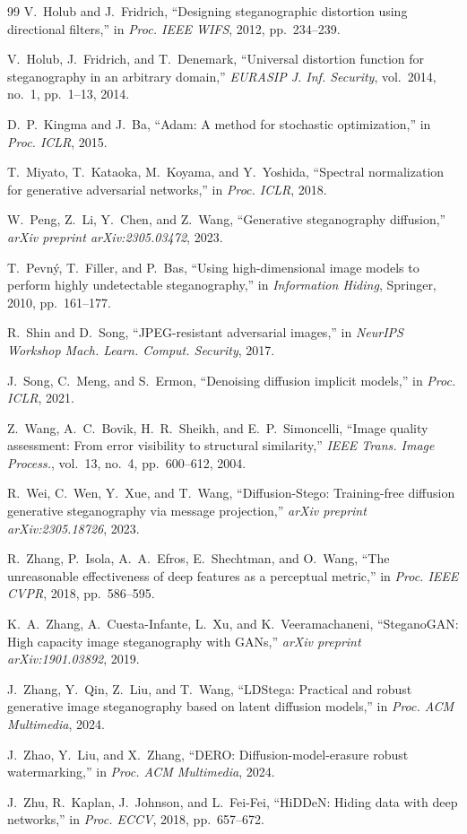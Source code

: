\documentclass[journal]{IEEEtran}
\begin{document}
\begin{thebibliography}{99}
V.~Holub and J.~Fridrich, ``Designing steganographic distortion using directional filters,'' in \emph{Proc. IEEE WIFS}, 2012, pp.~234--239.

V.~Holub, J.~Fridrich, and T.~Denemark, ``Universal distortion function for steganography in an arbitrary domain,'' \emph{EURASIP J. Inf. Security}, vol.~2014, no.~1, pp.~1--13, 2014.

D.~P.~Kingma and J.~Ba, ``Adam: A method for stochastic optimization,'' in \emph{Proc. ICLR}, 2015.

T.~Miyato, T.~Kataoka, M.~Koyama, and Y.~Yoshida, ``Spectral normalization for generative adversarial networks,'' in \emph{Proc. ICLR}, 2018.

W.~Peng, Z.~Li, Y.~Chen, and Z.~Wang, ``Generative steganography diffusion,'' \emph{arXiv preprint arXiv:2305.03472}, 2023.

T.~Pevn{\'y}, T.~Filler, and P.~Bas, ``Using high-dimensional image models to perform highly undetectable steganography,'' in \emph{Information Hiding}, Springer, 2010, pp.~161--177.

R.~Shin and D.~Song, ``{JPEG}-resistant adversarial images,'' in \emph{NeurIPS Workshop Mach. Learn. Comput. Security}, 2017.

J.~Song, C.~Meng, and S.~Ermon, ``Denoising diffusion implicit models,'' in \emph{Proc. ICLR}, 2021.

Z.~Wang, A.~C.~Bovik, H.~R.~Sheikh, and E.~P.~Simoncelli, ``Image quality assessment: From error visibility to structural similarity,'' \emph{IEEE Trans. Image Process.}, vol.~13, no.~4, pp.~600--612, 2004.

R.~Wei, C.~Wen, Y.~Xue, and T.~Wang, ``Diffusion-Stego: Training-free diffusion generative steganography via message projection,'' \emph{arXiv preprint arXiv:2305.18726}, 2023.

R.~Zhang, P.~Isola, A.~A.~Efros, E.~Shechtman, and O.~Wang, ``The unreasonable effectiveness of deep features as a perceptual metric,'' in \emph{Proc. IEEE CVPR}, 2018, pp.~586--595.

K.~A.~Zhang, A.~Cuesta-Infante, L.~Xu, and K.~Veeramachaneni, ``{SteganoGAN}: High capacity image steganography with {GANs},'' \emph{arXiv preprint arXiv:1901.03892}, 2019.

J.~Zhang, Y.~Qin, Z.~Liu, and T.~Wang, ``{LDStega}: Practical and robust generative image steganography based on latent diffusion models,'' in \emph{Proc. ACM Multimedia}, 2024.

J.~Zhao, Y.~Liu, and X.~Zhang, ``{DERO}: Diffusion-model-erasure robust watermarking,'' in \emph{Proc. ACM Multimedia}, 2024.

J.~Zhu, R.~Kaplan, J.~Johnson, and L.~Fei-Fei, ``{HiDDeN}: Hiding data with deep networks,'' in \emph{Proc. ECCV}, 2018, pp.~657--672.

\end{thebibliography}
\end{document}
